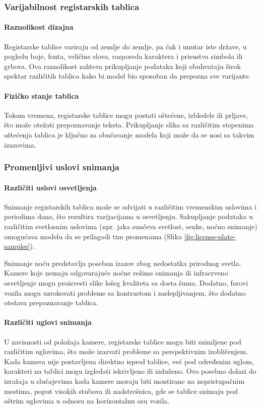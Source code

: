 \documentclass[a4paper,12pt]{article}
\begin{document}
	\subsubsection{Varijabilnost registarskih tablica}
	\paragraph{Raznolikost dizajna}
	Registarske tablice variraju od zemlje do zemlje, pa čak i unutar iste države, u pogledu boje, fonta, veličine slova, rasporeda karaktera i prisustva simbola ili grbova. Ova raznolikost zahteva prikupljanje podataka koji obuhvataju širok spektar različitih tablica kako bi model bio sposoban da prepozna sve varijante.
	
	\paragraph{Fizičko stanje tablica}
	Tokom vremena, registarske tablice mogu postati oštećene, izbledele ili prljave, što može otežati prepoznavanje teksta. Prikupljanje slika sa različitim stepenima oštećenja tablica je ključno za obučavanje modela koji može da se nosi sa takvim izazovima.
	
	\subsubsection{Promenljivi uslovi snimanja}
	\paragraph{Različiti uslovi osvetljenja}
	Snimanje registarskih tablica može se odvijati u različitim vremenskim uslovima i periodima dana, što rezultira varijacijama u osvetljenju. Sakupljanje podataka u različitim svetlosnim uslovima (npr. jaka sunčeva svetlost, senke, noćno snimanje) omogućava modelu da se prilagodi tim promenama (Slika \ref{fig:license-plate-samples}).
	
	Snimanje noću predstavlja poseban izazov zbog nedostatka prirodnog svetla. Kamere koje nemaju odgovarajuće noćne režime snimanja ili infracrveno osvetljenje mogu proizvesti slike lošeg kvaliteta sa dosta šuma. Dodatno, farovi vozila mogu uzrokovati probleme sa kontrastom i zaslepljivanjem, što dodatno otežava prepoznavanje tablica.
	
	\paragraph{Različiti uglovi snimanja}
	U zavisnosti od položaja kamere, registarske tablice mogu biti snimljene pod različitim uglovima, što može izazvati probleme sa perspektivnim izobličenjem. Kada kamera nije postavljena direktno ispred tablice, već pod određenim uglom, karakteri na tablici mogu izgledati iskrivljeno ili izduženo. Ovo posebno dolazi do izražaja u slučajevima kada kamere moraju biti montirane na nepristupačnim mestima, poput visokih stubova ili nadstrešnica, gde se tablice snimaju pod oštrim uglovima u odnosu na horizontalnu osu vozila.
	
\end{document}
